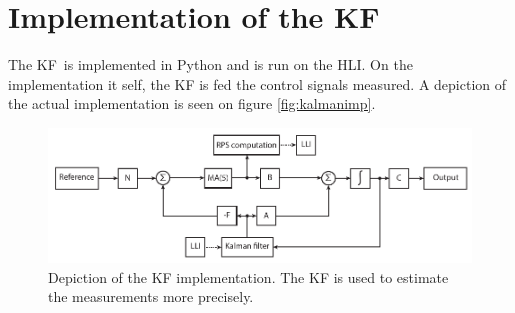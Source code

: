 \section{Implementation of the \ac{KF}}
The \ac{KF} is implemented in Python and is run on the \ac{HLI}. On the implementation it self, the \ac{KF} is fed the control signals measured. A depiction of the actual implementation is seen on figure \vref{fig:kalmanimp}.

\begin{figure}[htbp]
	\centering
	\includegraphics[width=\textwidth]{img/kalmanim}
	\caption{Depiction of the \ac{KF} implementation. The \ac{KF} is used to estimate the measurements more precisely.}
	\label{fig:kalmanimp}
\end{figure}
